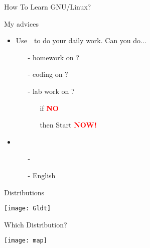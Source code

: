 \begin{frame}{How To Learn GNU/Linux?}
  \begin{block}{My advices}
    \begin{itemize}
    \item Use \,{\linux}\, to do your daily work. Can you do...
      \begin{itemize}
      \item[-] homework on \linux?
      \item[-] coding on \linux?
      \item[-] lab work on \linux?
        \begin{itemize}
        \item[if] \textbf{\textcolor{Red}{\purisa NO}}
        \item[then] Start \textbf{\textcolor{Red}{\purisa NOW!}}
        \end{itemize}
      \end{itemize}
    \item {\nerd } \world
      \begin{itemize}
      \item[-] \google
      \item[-] {\purisa English}
      \end{itemize}
    \end{itemize}
  \end{block}
\end{frame}

\begin{frame}{Distributions}
  \begin{center}
    \texttt{[image: Gldt]}
  \end{center}
\end{frame}

\begin{frame}{Which Distribution?}
  \begin{center}
    \texttt{[image: map]}
  \end{center}
\end{frame}




